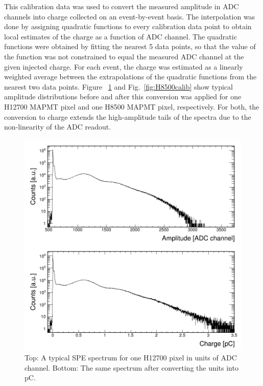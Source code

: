 This calibration data was used to convert the measured amplitude in ADC channels into charge collected on an event-by-event basis. The interpolation was done by assigning quadratic functions to every calibration data point to obtain local estimates of the charge as a function of ADC channel. The quadratic functions were obtained by fitting the nearest 5 data points, so that the value of the function was not constrained to equal the measured ADC channel at the given injected charge. For each event, the charge was estimated as a linearly weighted average between the extrapolations of the quadratic functions from the nearest two data points. Figure ~\ref{fig:H12700calib} and Fig.~\ref{fig:H8500calib} show typical amplitude distributions before and after this conversion was applied for one H12700 MAPMT pixel and one H8500 MAPMT pixel, respectively. For both, the conversion to charge extends the high-amplitude tails of the spectra due to the non-linearity of the ADC readout.

\begin{figure}[hbt!]
	\centering
	\includegraphics[width=\linewidth]{figures/GA0982_w1_g064_v1100_063_adc_charge.png}
	\caption{Top: A typical SPE spectrum for one H12700 pixel in units of ADC channel. Bottom: The same spectrum after converting the units into pC.}
	\label{fig:H12700calib}
\end{figure}

